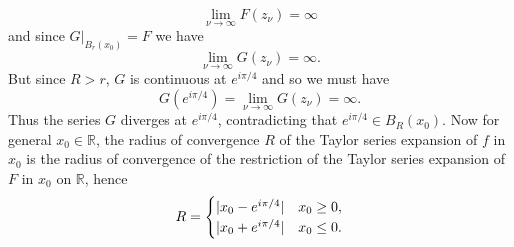 \begin{enumerate}[label = \textbf{Exercise \arabic*.},wide = 0pt, itemsep=1.5ex]
		\begin{equation}
			\lim_{\nu \to \infty}F(z_\nu) = \infty
		\end{equation}
		\noindent and since $G\vert_{B_r(x_0)} = F$ we have
		\begin{equation}
			\lim_{\nu \to \infty} G(z_\nu) = \infty.	
		\end{equation}
		\noindent But since $R > r$, $G$ is continuous at $e^{i\pi/4}$ and so we must have
		\begin{equation}
			G(e^{i\pi/4}) = \lim_{\nu \to \infty}G(z_\nu) = \infty.
		\end{equation}
		Thus the series $G$ diverges at $e^{i\pi/4}$, contradicting that $e^{i\pi/4} \in B_R(x_0)$. Now for general $x_0 \in \mathbb{R}$, the radius of convergence $R$ of the Taylor series expansion of $f$ in $x_0$ is the radius of convergence of the restriction of the Taylor series expansion of $F$ in $x_0$ on $\mathbb{R}$, hence
		\begin{align*}
			R = \begin{cases}
				\abs[0]{x_0 - e^{i\pi/4}} & x_0 \geq 0,\\
				\abs[0]{x_0 + e^{i\pi/4}} & x_0 \leq 0.
			\end{cases}
		\end{align*}

\end{enumerate}
\printbibliography

